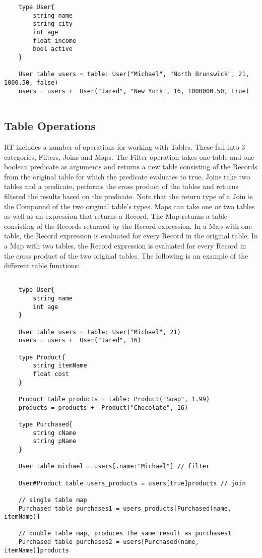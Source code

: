 \begin{verbatim}
	type User{
		string name
		string city
		int age
		float income
		bool active
	}
	
	User table users = table: User("Michael", "North Brunswick", 21, 1000.50, false)
	users = users +  User("Jared", "New York", 16, 1000000.50, true)
	
\end{verbatim}

\subsection{Table Operations}
RT includes a number of operations for working with Tables. These fall into 3 categories, Filters, Joins and Maps.
The Filter operation takes one table and one boolean predicate as arguments and returns a new table
consisting of the Records from the original table for which the predicate evaluates to true. Joins take two tables
and a predicate, performs the cross product of the tables and returns filtered the results based on the predicate. 
Note that the return type of a Join is the Compound of the two original table's types. Maps can take one or two 
tables as well as an expression that returns a Record. The Map returns a table consisting of the Records returned 
by the Record expression. In a Map with one table, the Record expression is evaluated for every Record in the  
original table. In a Map with two tables, the Record expression is evaluated for every Record in the cross 
product of the two original tables. The following is an example of the different table functions: 
\begin{verbatim}
	
	type User{
		string name
		int age
	}
	
	User table users = table: User("Michael", 21)
	users = users +  User("Jared", 16)
	
	type Product{
		string itemName
		float cost
	}
	
	Product table products = table: Product("Soap", 1.99)
	products = products +  Product("Chocolate", 16)
	
	type Purchased{
		string cName
		string pName
	}
	
	User table michael = users[.name:"Michael"] // filter
	
	User#Product table users_products = users[true]products // join
	
	// single table map
	Purchased table purchases1 = users_products[Purchased(name, itemName)] 
	
	// double table map, produces the same result as purchases1
	Purchased table purchases2 = users[Purchased(name, itemName)]products
	
\end{verbatim}

